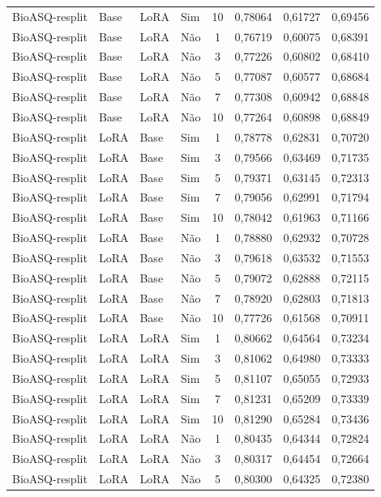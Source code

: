 \begin{longtable}{llllcccc}
BioASQ-resplit & Base & LoRA & Sim & 10 & 0,78064 & 0,61727 & 0,69456 \\
BioASQ-resplit & Base & LoRA & Não & 1 & 0,76719 & 0,60075 & 0,68391 \\
BioASQ-resplit & Base & LoRA & Não & 3 & 0,77226 & 0,60802 & 0,68410 \\
BioASQ-resplit & Base & LoRA & Não & 5 & 0,77087 & 0,60577 & 0,68684 \\
BioASQ-resplit & Base & LoRA & Não & 7 & 0,77308 & 0,60942 & 0,68848 \\
BioASQ-resplit & Base & LoRA & Não & 10 & 0,77264 & 0,60898 & 0,68849 \\
BioASQ-resplit & LoRA & Base & Sim & 1 & 0,78778 & 0,62831 & 0,70720 \\
BioASQ-resplit & LoRA & Base & Sim & 3 & 0,79566 & 0,63469 & 0,71735 \\
BioASQ-resplit & LoRA & Base & Sim & 5 & 0,79371 & 0,63145 & 0,72313 \\
BioASQ-resplit & LoRA & Base & Sim & 7 & 0,79056 & 0,62991 & 0,71794 \\
BioASQ-resplit & LoRA & Base & Sim & 10 & 0,78042 & 0,61963 & 0,71166 \\
BioASQ-resplit & LoRA & Base & Não & 1 & 0,78880 & 0,62932 & 0,70728 \\
BioASQ-resplit & LoRA & Base & Não & 3 & 0,79618 & 0,63532 & 0,71553 \\
BioASQ-resplit & LoRA & Base & Não & 5 & 0,79072 & 0,62888 & 0,72115 \\
BioASQ-resplit & LoRA & Base & Não & 7 & 0,78920 & 0,62803 & 0,71813 \\
BioASQ-resplit & LoRA & Base & Não & 10 & 0,77726 & 0,61568 & 0,70911 \\
BioASQ-resplit & LoRA & LoRA & Sim & 1 & 0,80662 & 0,64564 & 0,73234 \\
BioASQ-resplit & LoRA & LoRA & Sim & 3 & 0,81062 & 0,64980 & 0,73333 \\
BioASQ-resplit & LoRA & LoRA & Sim & 5 & 0,81107 & 0,65055 & 0,72933 \\
BioASQ-resplit & LoRA & LoRA & Sim & 7 & 0,81231 & 0,65209 & 0,73339 \\
BioASQ-resplit & LoRA & LoRA & Sim & 10 & 0,81290 & 0,65284 & 0,73436 \\
BioASQ-resplit & LoRA & LoRA & Não & 1 & 0,80435 & 0,64344 & 0,72824 \\
BioASQ-resplit & LoRA & LoRA & Não & 3 & 0,80317 & 0,64454 & 0,72664 \\
BioASQ-resplit & LoRA & LoRA & Não & 5 & 0,80300 & 0,64325 & 0,72380 \\

\end{longtable}
